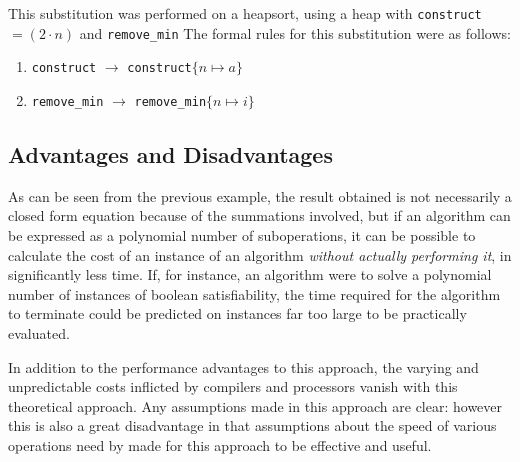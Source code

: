 \par
\bigskip

This substitution was performed on a heapsort, using a heap with \texttt{construct} $ = (2 \cdot n)$ and \texttt{remove\_min} 
The formal rules for this substitution were as follows:

\begin{enumerate}

\item \texttt{construct} $\rightarrow$ \texttt{construct}$\{n \mapsto a\}$

\item \texttt{remove\_min} $\rightarrow$ \texttt{remove\_min}$\{n \mapsto i\}$

\end{enumerate}

\subsection{Advantages and Disadvantages}

As can be seen from the previous example, the result obtained is not necessarily a closed form equation because of the summations involved, but if an algorithm can be expressed as a polynomial number of suboperations, it can be possible to calculate the cost of an instance of an algorithm \textit{without actually performing it}, in significantly less time.  If, for instance, an algorithm were to solve a polynomial number of instances of boolean satisfiability, the time required for the algorithm to terminate could be predicted on instances far too large to be practically evaluated.

In addition to the performance advantages to this approach, the varying and unpredictable costs inflicted by compilers and processors vanish with this theoretical approach.  Any assumptions made in this approach are clear: however this is also a great disadvantage in that assumptions about the speed of various operations need by made for this approach to be effective and useful.


